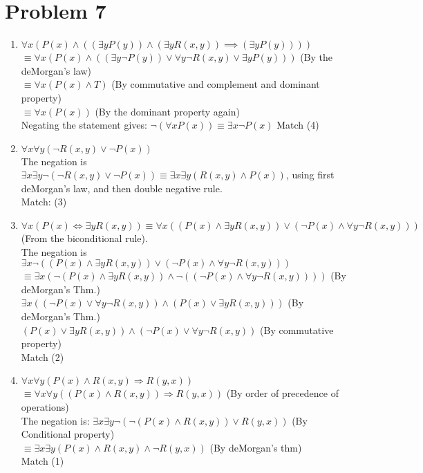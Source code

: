 \documentclass[english]{article}
\begin{document}
\section*{Problem 7}
\begin{enumerate}  [label=\Alph*]
	\item $\forall x (P(x) \land ((\exists y P(y)) \land (\exists y R(x,y)) \implies (\exists y P(y))))$ \\
	$ \equiv \forall x (P(x) \land ((\exists y \lnot P(y)) \lor  \forall y \lnot R(x,y) \lor \exists y P(y))) $ \qquad (By the deMorgan's law) \\ $ \equiv \forall x (P(x) \land T ) $ \qquad (By commutative and complement and dominant property) \\ $\equiv \forall x (P(x)) $ \qquad (By the dominant property again) \\ Negating the statement gives: $\lnot (\forall x P(x)) \equiv \exists x \lnot P(x) $
	Match (4)
	\item $\forall x \forall y (\lnot R(x,y) \lor \lnot P(x))$ \\ The negation is $\exists x \exists y \lnot (\lnot R (x,y) \lor \lnot P(x)) \equiv \exists x \exists y (R(x,y) \land P(x)) $, using first deMorgan's law, and then double negative rule. \\
	Match: (3)
	\item $\forall x (P(x) \iff \exists y R(x,y)) \equiv \forall x ((P(x) \land \exists y R(x,y)) \lor (\lnot P(x) \land \forall y \lnot R(x,y))) $ \qquad (From the biconditional rule). \\ The negation is $ \exists x \lnot ((P(x) \land \exists y R(x,y)) \lor (\lnot P(x) \land \forall y \lnot R(x,y)))$ \\ $\equiv \exists x (\lnot (P(x) \land \exists y R(x,y)) \land \lnot((\lnot P(x) \land \forall y \lnot R(x,y))))$ \qquad (By deMorgan's Thm.) \\ $\exists x ((\lnot P(x) \lor \forall y \lnot R(x,y)) \land (P(x) \lor \exists y R(x,y)))$ \qquad (By deMorgan's Thm.) \\ $(P(x) \lor \exists y R(x,y)) \land (\lnot P(x) \lor \forall y \lnot R(x,y))$ \qquad  (By commutative property) \\ Match (2)
	\item $\forall x \forall y (P(x) \land R(x,y) \Rightarrow R(y,x))$ \\ $ \equiv \forall x \forall y ((P(x) \land R(x,y)) \Rightarrow R(y,x))$ \qquad (By order of precedence of operations) \\ The negation is: $ \exists x \exists y \lnot(\lnot(P(x) \land R(x,y)) \lor R(y,x)) $ \qquad (By Conditional property) \\ $ \equiv \exists x \exists y (P(x) \land R(x,y) \land \lnot R(y,x))$ \qquad (By deMorgan's thm) \\ Match (1)

\end{enumerate}
\end{document}
